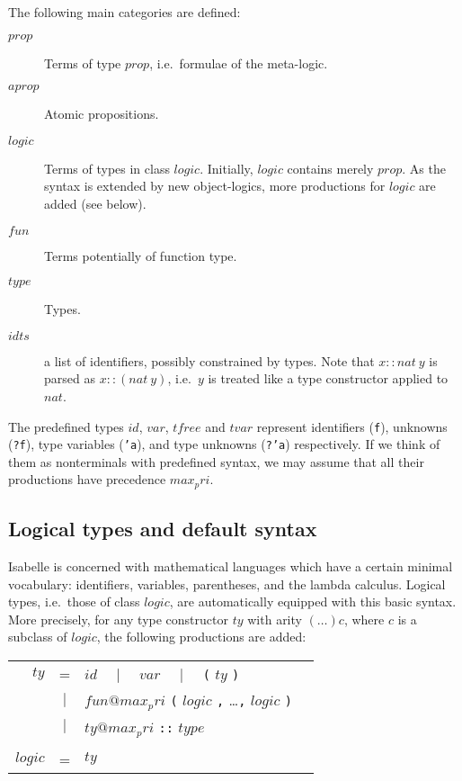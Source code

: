 The following main categories are defined:
\begin{description}
\item[$prop$] Terms of type $prop$, i.e.\ formulae of the meta-logic.
\item[$aprop$] Atomic propositions.
\item[$logic$] Terms of types in class $logic$.  Initially, $logic$ contains
  merely $prop$.  As the syntax is extended by new object-logics, more
  productions for $logic$ are added (see below).
\item[$fun$] Terms potentially of function type.
\item[$type$] Types.
\item[$idts$] a list of identifiers, possibly constrained by types.  Note
  that $x::nat~y$ is parsed as $x::(nat~y)$, i.e.\ $y$ is treated like a
  type constructor applied to $nat$.
\end{description}

The predefined types $id$, $var$, $tfree$ and $tvar$ represent identifiers
({\tt f}), unknowns ({\tt ?f}), type variables ({\tt 'a}), and type unknowns
({\tt ?'a}) respectively.  If we think of them as nonterminals with
predefined syntax, we may assume that all their productions have precedence
$max_pri$.

\subsection{Logical types and default syntax}

Isabelle is concerned with mathematical languages which have a certain
minimal vocabulary: identifiers, variables, parentheses, and the lambda
calculus.  Logical types, i.e.\ those of class $logic$, are automatically
equipped with this basic syntax.  More precisely, for any type constructor
$ty$ with arity $(\dots)c$, where $c$ is a subclass of $logic$, the following
productions are added:
\begin{center}
\begin{tabular}{rclc}
$ty$ &=& $id$ ~~$|$~~ $var$ ~~$|$~~ {\tt(} $ty$ {\tt)} \\
  &$|$& $fun@{max_pri}$ {\tt(} $logic$ {\tt,} \dots {\tt,} $logic$ {\tt)}\\
  &$|$& $ty@{max_pri}$ {\tt::} $type$\\\\
$logic$ &=& $ty$
\end{tabular}
\end{center}



